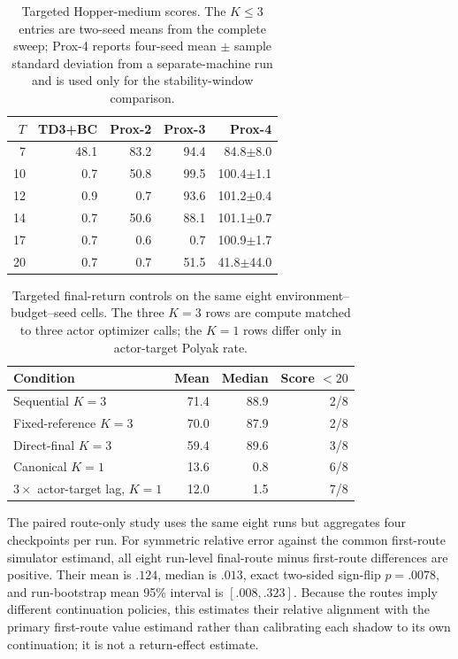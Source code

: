 \begin{table}[H]
\centering
\caption{Targeted Hopper-medium scores. The $K\le3$ entries are two-seed means from the complete sweep; Prox-4 reports four-seed mean $\pm$ sample standard deviation from a separate-machine run and is used only for the stability-window comparison.}
\label{tab:hopper_k4}
\scriptsize
\begin{tabular}{rrrrr}
\toprule
$T$ & TD3+BC & Prox-2 & Prox-3 & Prox-4\\
\midrule
7  &48.1&83.2&94.4&84.8$\pm$8.0\\
10 &0.7&50.8&99.5&100.4$\pm$1.1\\
12 &0.9&0.7&93.6&101.2$\pm$0.4\\
14 &0.7&50.6&88.1&101.1$\pm$0.7\\
17 &0.7&0.6&0.7&100.9$\pm$1.7\\
20 &0.7&0.7&51.5&41.8$\pm$44.0\\
\bottomrule
\end{tabular}
\end{table}

\begin{table}[H]
\centering
\caption{Targeted final-return controls on the same eight environment--budget--seed cells. The three $K=3$ rows are compute matched to three actor optimizer calls; the $K=1$ rows differ only in actor-target Polyak rate.}
\label{tab:targeted_controls}
\scriptsize
\begin{tabular}{lrrr}
\toprule
Condition & Mean & Median & Score $<20$\\
\midrule
Sequential $K=3$ &71.4&88.9&2/8\\
Fixed-reference $K=3$ &70.0&87.9&2/8\\
Direct-final $K=3$ &59.4&89.6&3/8\\
\midrule
Canonical $K=1$ &13.6&0.8&6/8\\
$3\times$ actor-target lag, $K=1$ &12.0&1.5&7/8\\
\bottomrule
\end{tabular}
\end{table}

The paired route-only study uses the same eight runs but aggregates four checkpoints per run. For symmetric relative error against the common first-route simulator estimand, all eight run-level final-route minus first-route differences are positive. Their mean is $.124$, median is $.013$, exact two-sided sign-flip $p=.0078$, and run-bootstrap mean 95\% interval is $[.008,.323]$. Because the routes imply different continuation policies, this estimates their relative alignment with the primary first-route value estimand rather than calibrating each shadow to its own continuation; it is not a return-effect estimate.

